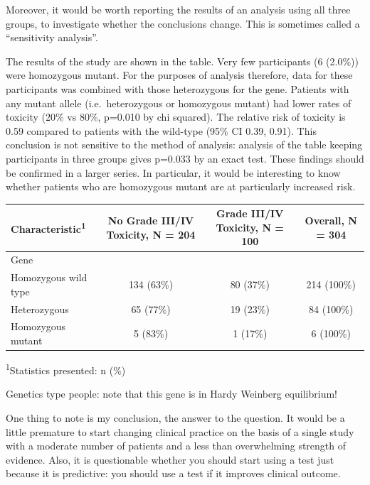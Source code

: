 \documentclass[]{book}
\begin{document}
Moreover, it would be worth reporting the results of an analysis using
all three groups, to investigate whether the conclusions change. This is
sometimes called a ``sensitivity analysis''.

The results of the study are shown in the table. Very few participants
(6 (2.0\%)) were homozygous mutant. For the purposes of analysis
therefore, data for these participants was combined with those
heterozygous for the gene. Patients with any mutant allele
(i.e.~heterozygous or homozygous mutant) had lower rates of toxicity
(20\% vs 80\%, p=0.010 by chi squared). The relative risk of toxicity is
0.59 compared to patients with the wild-type (95\% CI 0.39, 0.91). This
conclusion is not sensitive to the method of analysis: analysis of the
table keeping participants in three groups gives p=0.033 by an exact
test. These findings should be confirmed in a larger series. In
particular, it would be interesting to know whether patients who are
homozygous mutant are at particularly increased risk.

\captionsetup[table]{labelformat=empty,skip=1pt}
\begin{longtable}{lccc}
\toprule
\textbf{Characteristic}\textsuperscript{1} & \textbf{No Grade III/IV Toxicity}, N = 204 & \textbf{Grade III/IV Toxicity}, N = 100 & \textbf{Overall}, N = 304 \\ 
\midrule
Gene &  &  &  \\ 
Homozygous wild type & 134 (63\%) & 80 (37\%) & 214 (100\%) \\ 
Heterozygous & 65 (77\%) & 19 (23\%) & 84 (100\%) \\ 
Homozygous mutant & 5 (83\%) & 1 (17\%) & 6 (100\%) \\ 
\bottomrule
\end{longtable}
\vspace{-5mm}
\begin{minipage}{\linewidth}
\textsuperscript{1}Statistics presented: n (\%) \\ 
\end{minipage}

Genetics type people: note that this gene is in Hardy Weinberg
equilibrium!

One thing to note is my conclusion, the answer to the question. It would
be a little premature to start changing clinical practice on the basis
of a single study with a moderate number of patients and a less than
overwhelming strength of evidence. Also, it is questionable whether you
should start using a test just because it is predictive: you should use
a test if it improves clinical outcome.
\end{document}
